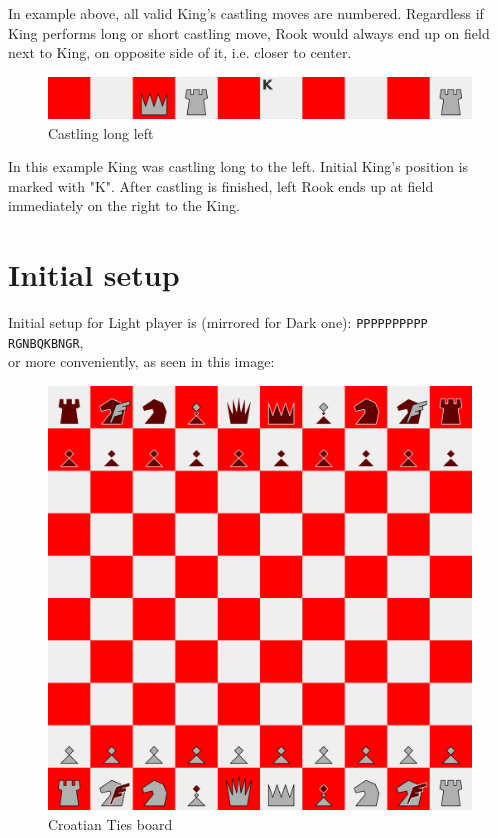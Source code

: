 \documentclass[a5paper,12pt,draft]{book} %
\begin{document}
\indent
In example above, all valid King's castling moves are numbered. Regardless if King performs
long or short castling move, Rook would always end up on field next to King, on opposite side
of it, i.e. closer to center.

\noindent
\begin{figure}[!h]
\includegraphics[width=1.0\textwidth, keepaspectratio=true]{../gfx/castlings/long_left/04_croatian_ties_castling_long_left.png}
\caption{Castling long left}
\label{fig:cc_castling_long_left}
\end{figure}

\indent
In this example King was castling long to the left. Initial King's position is marked with "K".
After castling is finished, left Rook ends up at field immediately on the right to the King.

\clearpage

\section*{Initial setup}

Initial setup for Light player is (mirrored for Dark one):
\texttt{PPPPPPPPPP \\
        RGNBQKBNGR}, \\
or more conveniently, as seen in this image:

\noindent
\begin{figure}[h]
\includegraphics[width=1.0\textwidth, keepaspectratio=true]{../gfx/boards/04_croatian_ties.png}
\caption{Croatian Ties board}
\label{fig:croatian_ties}
\end{figure}
\end{document}
